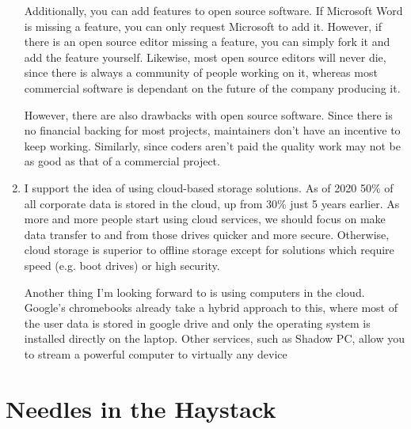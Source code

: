 \documentclass{scrartcl}
\begin{document}
\begin{enumerate}
Additionally, you can add features to open source software. If Microsoft Word is
missing a feature, you can only request Microsoft to add it. However, if
there is an open source editor missing a feature, you can simply fork it and
add the feature yourself. Likewise, most open source editors will never die,
since there is always a community of people working on it, whereas most
commercial software is dependant on the future of the company producing it.

However, there are also drawbacks with open source software. Since there is
no financial backing for most projects, maintainers don't have an incentive
to keep working. Similarly, since coders aren't paid the quality work may not
be as good as that of a commercial project.

\item I support the idea of using cloud-based storage solutions. As of 2020 50\% of all
corporate data is stored in the cloud, up from 30\% just 5 years earlier. As
more and more people start using cloud services,  we should focus on make
data transfer to and from those drives quicker and more secure. Otherwise,
cloud storage is superior to offline storage except for solutions which
require speed (e.g. boot drives) or high security.

Another thing I'm looking forward to is using computers in the cloud.
Google's chromebooks already take a hybrid approach to this, where most of
the user data is stored in google drive and only the operating system is
installed directly on the laptop. Other services, such as Shadow PC, allow
you to stream a powerful computer to virtually any device
\end{enumerate}

\section{Needles in the Haystack}
\label{sec:org9fa4524}
\end{document}
